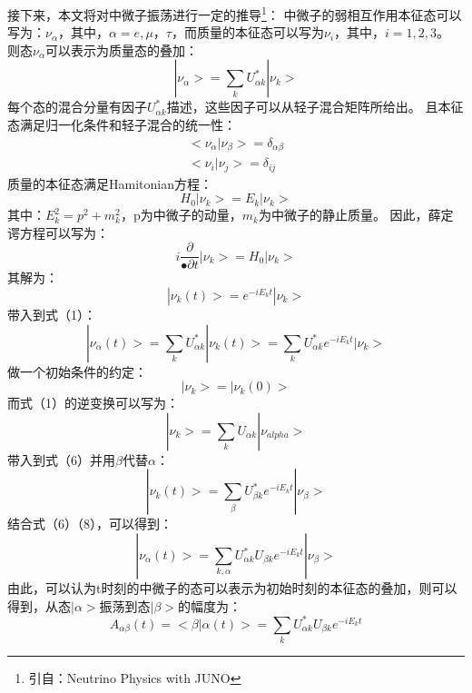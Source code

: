 \documentclass[15pt,a4paper]{article}
\begin{document}
接下来，本文将对中微子振荡进行一定的推导\footnote{引自：Neutrino Physics with JUNO}：
中微子的弱相互作用本征态可以写为：$\nu_{\alpha}$，其中，$\alpha=e,\mu，\tau$，而质量的本征态可以写为$\nu_{i}$，其中，$i=1,2,3$。
则态$\nu_{\alpha}$可以表示为质量态的叠加：
\begin{equation}
|\nu_{\alpha}>=\sum_{k}U_{\alpha k}^{*}|\nu_{k}>
\end{equation}
每个态的混合分量有因子$U_{\alpha k}^{*}$描述，这些因子可以从轻子混合矩阵所给出。
且本征态满足归一化条件和轻子混合的统一性：
\begin{equation}
\begin{split}
<\nu_{\alpha}|\nu_{\beta}>=\delta_{\alpha\beta}\\
<\nu_{i}|\nu_{j}>=\delta_{ij}
\end{split}
\end{equation}
质量的本征态满足Hamitonian方程：
\begin{equation}
H_{0}|\nu_{k}>=E_{k}|\nu_{k}>
\end{equation}
其中：$E_{k}^2=p^2+m_{k}^2$，p为中微子的动量，$m_{k}$为中微子的静止质量。
因此，薛定谔方程可以写为：
\begin{equation}
i\frac{\partial}{•\partial t}|\nu_{k}>=H_{0}|\nu_{k}>
\end{equation}
其解为：
\begin{equation}
|\nu_{k}(t)>=e^{-iE_{k}t}|\nu_{k}>
\end{equation}
带入到式（1）：
\begin{equation}
|\nu_{\alpha}(t)>=\sum_{k}U_{\alpha k}^{*}|\nu_{k}(t)>=\sum_{k}U_{\alpha k}^{*}e^{-iE_{k}t}|\nu_{k}>
\end{equation}
做一个初始条件的约定：
\[|\nu_{k}>=|\nu_{k}(0)>\]
而式（1）的逆变换可以写为：
\begin{equation}
|\nu_{k}>=\sum_{k}U_{\alpha k}|\nu_{alpha}>
\end{equation}
带入到式（6）并用$\beta$代替$\alpha$：
\begin{equation}
|\nu_{k}(t)>=\sum_{\beta}U_{\beta k}^{*}e^{-iE_{k}t}|\nu_{\beta}>
\end{equation}
结合式（6）（8），可以得到：
\begin{equation}
|\nu_{\alpha}(t)>=\sum_{k,\alpha}U_{\alpha k}^{*}U_{\beta k}e^{-iE_{k}t}|\nu_{\beta}>
\end{equation}
由此，可以认为t时刻的中微子的态可以表示为初始时刻的本征态的叠加，则可以得到，从态$|\alpha>$振荡到态$|\beta>$的幅度为：
\begin{equation}
A_{\alpha\beta}(t)=<\beta|\alpha(t)>=\sum_{k}U_{\alpha k}^{*}U_{\beta k}e^{-iE_{k}t}
\end{equation}
\end{document}
